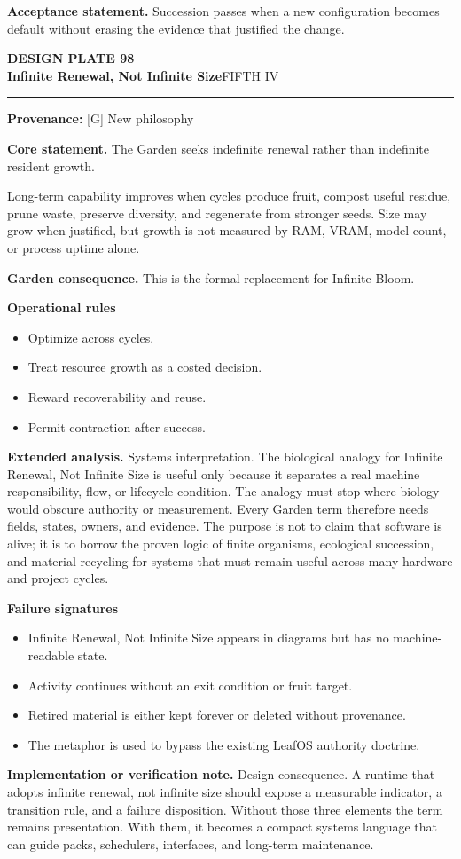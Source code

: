\documentclass[10pt,letterpaper,oneside]{article}
\newcommand{\prov}[1]{\textcolor{gardenBlue}{\sffamily\footnotesize\textbf{Provenance:} #1}}
\newcommand{\platetitle}[3]{%
  \begin{minipage}[t][0.54in][t]{\textwidth}
  {\sffamily\bfseries\color{gardenDeep}\fontsize{9}{10}\selectfont DESIGN PLATE #1}\\[-1pt]
  {\sffamily\bfseries\color{gardenInk}\fontsize{16.5}{18}\selectfont #2}\hfill{\sffamily\color{gardenGreen}\large #3}
  \end{minipage}\vspace{-2pt}\hrule\vspace{5pt}}
\begin{document}
\begin{acceptbox}
\textbf{Acceptance statement.} Succession passes when a new configuration becomes default without erasing the evidence that justified the change.
\end{acceptbox}
\newpage
\platetitle{98}{Infinite Renewal, Not Infinite Size}{FIFTH IV}
\prov{[G] New philosophy}
\fontsize{8.85}{10.45}\selectfont
\begin{corebox}
\textbf{Core statement.} The Garden seeks indefinite renewal rather than indefinite resident growth.
\end{corebox}
Long-term capability improves when cycles produce fruit, compost useful residue, prune waste, preserve diversity, and regenerate from stronger seeds. Size may grow when justified, but growth is not measured by RAM, VRAM, model count, or process uptime alone.

\textbf{Garden consequence.} This is the formal replacement for Infinite Bloom.

\textbf{Operational rules}
\begin{itemize}
\item Optimize across cycles.
\item Treat resource growth as a costed decision.
\item Reward recoverability and reuse.
\item Permit contraction after success.
\end{itemize}
\textbf{Extended analysis.} Systems interpretation. The biological analogy for Infinite Renewal, Not Infinite Size is useful only because it separates a real machine responsibility, flow, or lifecycle condition. The analogy must stop where biology would obscure authority or measurement. Every Garden term therefore needs fields, states, owners, and evidence. The purpose is not to claim that software is alive; it is to borrow the proven logic of finite organisms, ecological succession, and material recycling for systems that must remain useful across many hardware and project cycles.

\textbf{Failure signatures}
\begin{itemize}
\item Infinite Renewal, Not Infinite Size appears in diagrams but has no machine-readable state.
\item Activity continues without an exit condition or fruit target.
\item Retired material is either kept forever or deleted without provenance.
\item The metaphor is used to bypass the existing LeafOS authority doctrine.
\end{itemize}
\textbf{Implementation or verification note.} Design consequence. A runtime that adopts infinite renewal, not infinite size should expose a measurable indicator, a transition rule, and a failure disposition. Without those three elements the term remains presentation. With them, it becomes a compact systems language that can guide packs, schedulers, interfaces, and long-term maintenance.
\end{document}
